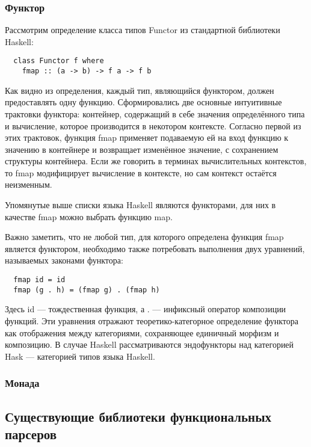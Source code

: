\subsubsection{Функтор}

Рассмотрим определение класса типов Functor из стандартной библиотеки Haskell:

\begin{lstlisting}
  class Functor f where
    fmap :: (a -> b) -> f a -> f b
\end{lstlisting}

Как видно из определения, каждый тип, являющийся функтором, должен предоставлять одну функцию. Сформировались две основные интуитивные трактовки функтора: контейнер, содержащий в себе значения определённого типа и вычисление, которое производится в некотором контексте. Согласно первой из этих трактовок, функция fmap применяет подаваемую ей на вход функцию к значению в контейнере и возвращает изменённое значение, с сохранением структуры контейнера. Если же говорить в терминах вычислительных контекстов, то fmap модифицирует вычисление в контексте, но сам контекст остаётся неизменным.

Упомянутые выше списки языка Haskell являются функторами, для них в качестве fmap можно выбрать функцию map. 

Важно заметить, что не любой тип, для которого определена функция fmap является функтором, необходимо также потребовать выполнения двух уравнений, называемых законами функтора:

\begin{lstlisting}
  fmap id = id
  fmap (g . h) = (fmap g) . (fmap h)
\end{lstlisting}

Здесь id --- тождественная функция, а . --- инфиксный оператор композиции функций. Эти уравнения отражают теоретико-категорное определение функтора как отображения между категориями, сохраняющее единичный морфизм и композицию. В случае Haskell рассматриваются эндофункторы над категорией Hask --- категорией типов языка Haskell.  

\subsubsection{Монада}

\subsection{Существующие библиотеки функциональных парсеров}

